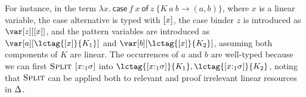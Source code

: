\documentclass[acmsmall,review,screen]{acmart}
\newcommand{\ccase}[2]{\mathsf{case}~#1~\mathsf{of}~#2}
\begin{document}
For instance, in the term $\lambda x.~\ccase{f~x}{z~\{K~a~b\to
  (a,b)\}}$, where $x$ is a linear variable, the case alternative is
typed with $\left[x\right]$,
the case binder $z$ is introduced as $\z[\irr{x}]$, and the pattern variables
are introduced as $\var[a][\lctag{\irr{x}}{K_1}]$ and
$\var[b][\lctag{\irr{x}}{K_2}]$, assuming both components of $K$ are linear.
%
The occurrences of $a$ and $b$ are well-typed because we can first
$\textsc{Split}$ $[x{:}_1\sigma]$ into $\lctag{[x{:}_1\s]}{K_1}, \lctag{[x{:}_1\s]}{K_2}$,
%
%
noting that $\textsc{Split}$ can be applied both to relevant and proof irrelevant linear
resources in $\Delta$.

\end{document}
